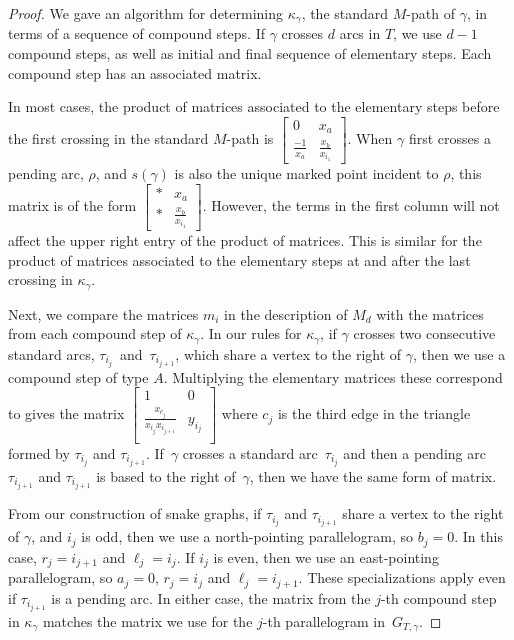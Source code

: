 \begin{proof}
We gave an algorithm for determining $\kappa_\gamma$, the standard $M$-path of $\gamma$, in terms of a sequence of compound steps. If $\gamma$ crosses $d$ arcs in $T$, we use $d-1$ compound steps, as well as initial and final sequence of elementary steps. Each compound step has an associated matrix.

In most cases, the product of matrices associated to the elementary steps before the first crossing in the standard $M$-path is $\left[\begin{smallmatrix} 0 & x_a \\ \frac{-1}{x_a} & \frac{x_b}{x_{i_1}} \end{smallmatrix}\right]$. When $\gamma$ first crosses a pending arc, $\rho$, and $s(\gamma)$ is also the unique marked point incident to $\rho$, this matrix is of the form $\left[\begin{smallmatrix} * & x_a \\ * & \frac{x_b}{x_{i_1}} \end{smallmatrix}\right]$. However, the terms in the first column will not affect the upper right entry of the product of matrices. This is similar for the product of matrices associated to the elementary steps at and after the last crossing in $\kappa_\gamma$.

Next, we compare the matrices $m_i$ in the description of $M_d$ with the matrices from each compound step of $\kappa_\gamma$. In our rules for $\kappa_\gamma$, if $\gamma$ crosses two consecutive standard arcs, $\tau_{i_j}$~and~$\tau_{i_{j+1}}$, which share a vertex to the right of $\gamma$, then we use a compound step of type $A$. Multiplying the elementary matrices these correspond to gives the matrix $\left[\begin{smallmatrix} 1 & 0 \\ \frac{x_{c_j}}{x_{i_j}x_{i_{j+1}}} & y_{i_j} \\ \end{smallmatrix}\right]$ where $c_j$ is the third edge in the triangle formed by $\tau_{i_j}$ and $\tau_{i_{j+1}}$. If~$\gamma$ crosses a standard arc~$\tau_{i_j}$ and then a pending arc $\tau_{i_{j+1}}$ and $\tau_{i_{j+1}}$ is based to the right of~$\gamma$, then we have the same form of matrix.

From our construction of snake graphs, if $\tau_{i_j}$ and $\tau_{i_{j+1}}$ share a vertex to the right of $\gamma$, and $i_j$ is odd, then we use a north-pointing parallelogram, so $b_j = 0$. In this case, $r_j = i_{j+1}$ and $\ell_j = i_j$.
If $i_j$ is even, then we use an east-pointing parallelogram, so $a_j =0$, $r_j = i_j$ and $\ell_j = i_{j+1}$.
These specializations apply even if $\tau_{i_{j+1}}$ is a pending arc. In either case, the matrix from the $j$-th compound step in $\kappa_\gamma$ matches the matrix we use for the $j$-th parallelogram in~$G_{T,\gamma}$.


\end{proof}
